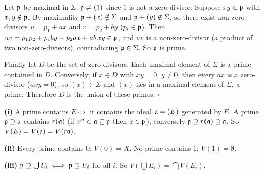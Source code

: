 \documentclass[11pt]{article}
\begin{document}
Let $\mathfrak p$ be maximal in $\Sigma$. $\mathfrak p\ne(1)$ since $1$ is not a zero-divisor. Suppose $xy\in\mathfrak p$ with $x,y\notin\mathfrak p$. By maximality $\mathfrak p+(x)\notin\Sigma$ and $\mathfrak p+(y)\notin\Sigma$, so there exist non-zero-divisors $u=p_1+ax$ and $v=p_2+by$ ($p_i\in\mathfrak p$). Then $uv=p_1p_2+p_1by+p_2ax+ab\,xy\in\mathfrak p$, and $uv$ is a non-zero-divisor (a product of two non-zero-divisors), contradicting $\mathfrak p\in\Sigma$. So $\mathfrak p$ is prime.

Finally let $D$ be the set of zero-divisors. Each maximal element of $\Sigma$ is a prime contained in $D$. Conversely, if $x\in D$ with $xy=0$, $y\ne0$, then every $ax$ is a zero-divisor ($axy=0$), so $(x)\in\Sigma$ and $(x)$ lies in a maximal element of $\Sigma$, a prime. Therefore $D$ is the union of these primes. \hfill$\square$

\pf
\textbf{(i)} A prime contains $E\iff$ it contains the ideal $\mathfrak a=(E)$ generated by $E$. A prime $\mathfrak p\supseteq\mathfrak a$ contains $r(\mathfrak a)$ (if $x^n\in\mathfrak a\subseteq\mathfrak p$ then $x\in\mathfrak p$); conversely $\mathfrak p\supseteq r(\mathfrak a)\supseteq\mathfrak a$. So $V(E)=V(\mathfrak a)=V(r\mathfrak a)$.

\textbf{(ii)} Every prime contains $0$: $V(0)=X$. No prime contains $1$: $V(1)=\emptyset$.

\textbf{(iii)} $\mathfrak p\supseteq\bigcup E_i\iff\mathfrak p\supseteq E_i$ for all $i$. So $V(\bigcup E_i)=\bigcap V(E_i)$.
\end{document}
